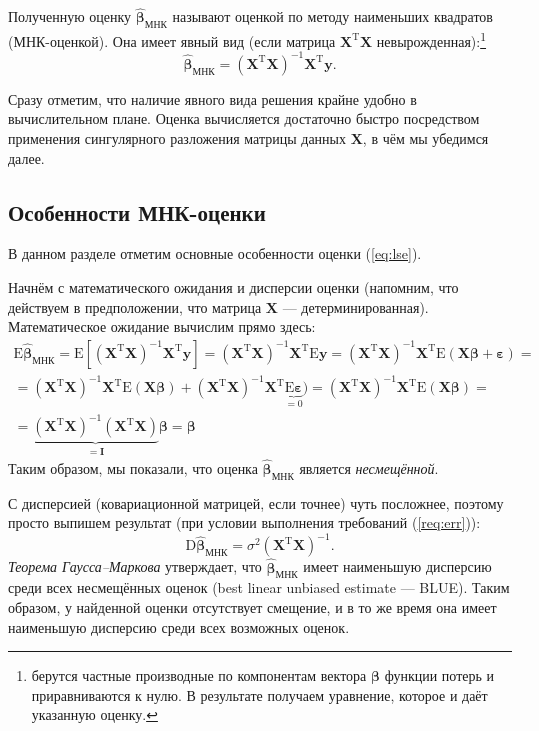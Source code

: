 \documentclass[12pt,a4paper,final]{article}
\newcommand{\betah}{\hat{\bm \beta}}
\newcommand{\betaa}{\bm{\beta}}
\newcommand{\epss}{\bm{\varepsilon}}
\newcommand{\E}{\mathrm{E}}
\newcommand{\D}{\mathrm{D}}
\newcommand{\XT}{{\bm{X}}^{\mathrm{T}}}
\newcommand{\X}{\bm{X}}
\newcommand{\y}{\bm{y}}
\newcommand{\1}{\mathds{1}}
\begin{document}
Полученную оценку $\betah_{\text{МНК}}$ называют оценкой по методу наименьших квадратов (МНК-оценкой). Она имеет явный вид (если матрица $\XT \X$ невырожденная):\footnote{берутся частные производные по компонентам вектора $\betaa$ функции потерь и приравниваются к нулю. В результате получаем уравнение, которое и даёт указанную оценку.}
\begin{equation}
  \betah_{\text{МНК}} = (\XT \X)^{-1}\XT \y.
  \label{eq:lse}
\end{equation}

Сразу отметим, что наличие явного вида решения крайне удобно в вычислительном плане. 
Оценка вычисляется достаточно быстро посредством применения сингулярного разложения матрицы данных $\X$, в чём мы убедимся далее.

\subsection{Особенности МНК-оценки}

В данном разделе отметим основные особенности оценки (\ref{eq:lse}).

Начнём с математического ожидания и дисперсии оценки (напомним, что действуем в предположении, что матрица $\X$ --- детерминированная). Математическое ожидание вычислим прямо здесь:
\begin{multline}
	\E \betah_{\text{МНК}} = \E [(\XT \X)^{-1}\XT \y] = (\XT \X)^{-1}\XT \E \y = (\XT \X)^{-1}\XT \E (\X \betaa + \epss) = \\ = (\XT \X)^{-1}\XT \E (\X \betaa) + (\XT \X)^{-1}\XT \underbrace{\E \epss}_{= 0}) = (\XT \X)^{-1}\XT \E (\X \betaa) = \\ = \underbrace{(\XT \X)^{-1}(\XT\X)}_{= \mathbf I}\betaa = \betaa
\end{multline}
Таким образом, мы показали, что оценка $\betah_{\text{МНК}}$ является \textit{несмещённой}. 

С дисперсией (ковариационной матрицей, если точнее) чуть посложнее, поэтому просто выпишем результат (при условии выполнения требований (\ref{req:err})):
\begin{equation}
  \D {\betah_{\text{МНК}}} = \sigma^2 (\XT\X)^{-1}.
  \label{eq:var}
\end{equation}
\textit{Теорема Гаусса--Маркова} утверждает, что $\betah_{\text{МНК}}$ имеет наименьшую дисперсию среди всех несмещённых оценок (best linear unbiased estimate --- BLUE). Таким образом, у найденной оценки отсутствует смещение, и в то же время она имеет наименьшую дисперсию среди всех возможных оценок.
\end{document}
